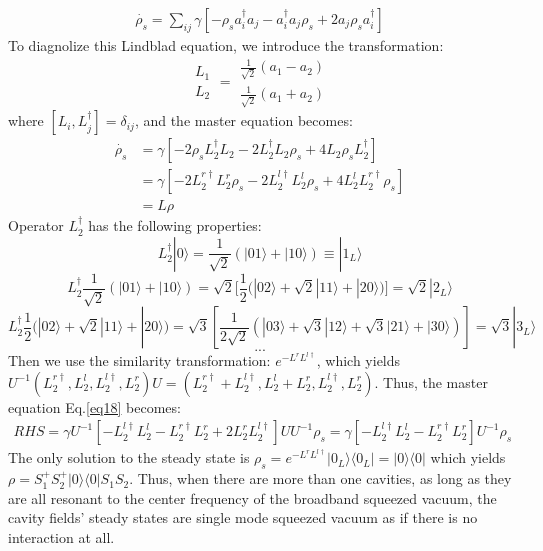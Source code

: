 \documentclass{article}
\begin{document}
\begin{equation}
\label{eq17}
\begin{split}
\dot{\rho_{s}}=\sum_{ij}\gamma[-\rho_{s}a_{i}^{\dagger}a_{j}-a_{i}^{\dagger}a_{j}\rho_{s}+2a_{j}\rho_{s}a_{i}^{\dagger}]
\end{split}
\end{equation}
To diagnolize this Lindblad equation, we introduce the transformation: $$\begin{array}{c}
L_{1}\\
L_{2}
\end{array}=\begin{array}{c}
\frac{1}{\sqrt{2}}(a_{1}-a_{2})\\
\frac{1}{\sqrt{2}}(a_{1}+a_{2})
\end{array}$$
where $[L_{i},L_{j}^{\dagger}]=\delta_{ij}$, and the master equation becomes:
\begin{equation}
\label{eq18}
\begin{split}
\dot{\rho_{s}}&=\gamma[-2\rho_{s}L_{2}^{\dagger}L_{2}-2L_{2}^{\dagger}L_{2}\rho_{s}+4L_{2}\rho_{s}L_{2}^{\dagger}]\\
&=\gamma[-2L_{2}^{r\dagger}L_{2}^{r}\rho_{s}-2L_{2}^{l\dagger}L_{2}^{l}\rho_{s}+4L_{2}^{l}L_{2}^{r\dagger}\rho_{s}]\\
&=L\rho
\end{split}
\end{equation}
Operator $L_2^{\dagger}$ has the following properties: $$L_{2}^{\dagger}|0\rangle=\frac{1}{\sqrt{2}}(|01\rangle+|10\rangle)\equiv|1_{L}\rangle$$ $$L_{2}^{\dagger}\frac{1}{\sqrt{2}}(|01\rangle+|10\rangle)=\sqrt{2}[\frac{1}{2}(|02\rangle+\sqrt{2}|11\rangle+|20\rangle)]=\sqrt{2}|2_{L}\rangle$$  $$L_{2}^{\dagger}\frac{1}{2}(|02\rangle+\sqrt{2}|11\rangle+|20\rangle)=\sqrt{3}[\frac{1}{2\sqrt{2}}(|03\rangle+\sqrt{3}|12\rangle+\sqrt{3}|21\rangle+|30\rangle)]=\sqrt{3}|3_{L}\rangle$$  $$...$$
Then we use the similarity transformation: $e^{-L^{r}L^{l\dagger}}$, which yields $U^{-1}(L_{2}^{r\dagger},L_{2}^{l},L_{2}^{l\dagger},L_{2}^{r})U=(L_{2}^{r\dagger}+L_{2}^{l\dagger},L_{2}^{l}+L_{2}^{r},L_{2}^{l\dagger},L_{2}^{r}) $. Thus, the master equation Eq.\eqref{eq18} becomes:
\begin{equation}
\label{eq18}
\begin{split}
RHS=\gamma U^{-1}[-L_2^{l\dagger}L_2^{l}-L_2^{r\dagger}L_2^{r}+2L_2^{r}L_2^{l\dagger}]UU^{-1}\rho_{s}=\gamma[-L_2^{l\dagger}L_2^{l}-L_2^{r\dagger}L_2^{r}]U^{-1}\rho_{s}
\end{split}
\end{equation}
The only solution to the steady state is $\rho_{s}=e^{-L^{r}L^{l\dagger}}|0_{L}\rangle\langle0_{L}|=|0\rangle\langle0|$ which yields $\rho=S_{1}^{+}S_{2}^{+}|0\rangle\langle0|S_{1}S_{2}$. Thus, when there are more than one cavities, as long as they are all resonant to the center frequency of the broadband squeezed vacuum, the cavity fields' steady states are single mode squeezed vacuum as if there is no interaction at all.
\end{document}
